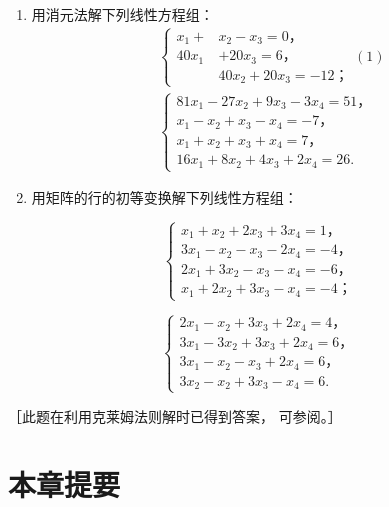 \begin{enumerate}
\item
  用消元法解下列线性方程组：
\[
\begin{array}{l} \left\{ \begin{array}{ll} x _ {1} + & x _ {2} - x _ {3} = 0\text{，} \\ 40 x _ {1} & + 20 x _ {3} = 6\text{，} \\ & 40 x _ {2} + 20 x _ {3} = - 12\text{；} \end{array} \right. (1) \\ \left\{ \begin{array}{ll} 81 x _ {1} - 27 x _ {2} + 9 x _ {3} - 3 x _ {4} = 51\text{，} \\ x _ {1} - x _ {2} + x _ {3} - x _ {4} = - 7\text{，} \\ x _ {1} + x _ {2} + x _ {3} + x _ {4} = 7\text{，} \\ 16 x _ {1} + 8 x _ {2} + 4 x _ {3} + 2 x _ {4} = 26. \end{array} \right. \end{array} \tag {1}
\]
\item
  用矩阵的行的初等变换解下列线性方程组：
\end{enumerate}

\[
\left\{ \begin{array}{l} x _ {1} + x _ {2} + 2 x _ {3} + 3 x _ {4} = 1\text{，} \\ 3 x _ {1} - x _ {2} - x _ {3} - 2 x _ {4} = - 4\text{，} \\ 2 x _ {1} + 3 x _ {2} - x _ {3} - x _ {4} = - 6\text{，} \\ x _ {1} + 2 x _ {2} + 3 x _ {3} - x _ {4} = - 4\text{；} \end{array} \right.
\]

\[
\left\{ \begin{array}{l} 2 x _ {1} - x _ {2} + 3 x _ {3} + 2 x _ {4} = 4\text{，} \\ 3 x _ {1} - 3 x _ {2} + 3 x _ {3} + 2 x _ {4} = 6\text{，} \\ 3 x _ {1} - x _ {2} - x _ {3} + 2 x _ {4} = 6\text{，} \\ 3 x _ {2} - x _ {2} + 3 x _ {3} - x _ {4} = 6. \end{array} \right.
\]

［此题在利用克莱姆法则解时已得到答案， 可参阅。］

\section{本章提要}


